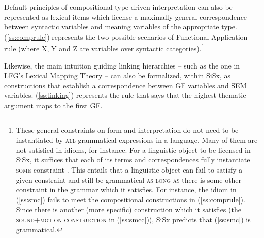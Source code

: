 \documentclass[output=paper,hidelinks]{langscibook}
\begin{document}
Default principles of compositional type-driven interpretation can also be represented as lexical items which license a maximally general correspondence between syntactic variables and meaning variables of the appropriate type. (\ref{ss:comprule}) represents the two possible scenarios of  Functional Application rule (where X, Y and Z are variables over syntactic categories).\footnote{These general constraints on form and interpretation do not need to be instantiated by \textsc{all} grammatical expressions in a language. Many of them are not satisfied in idioms, for instance. For a linguistic object to be licensed in SiSx, it suffices that each of its terms and correspondences fully instantiate \textsc{some} constraint \citep{culicover2019origin}. This entails that a linguistic object can fail to satisfy a given constraint and still be grammatical \textsc{as long as} there is some other constraint in the grammar which it satisfies. For instance, the idiom in (\ref{ss:smc}) fails to meet the compositional constructions in (\ref{ss:comprule}). Since there is another (more specific) construction which it satisfies (the \textsc{sound+motion construction} in (\ref{ss:smcc})), SiSx predicts that (\ref{ss:smc})  is grammatical.}


\begin{exe}
\label{ss:comprule}
\end{exe}


Likewise, the main intuition guiding linking hierarchies -- such as the one in LFG's Lexical Mapping Theory \citep{bresnan1989locative} -- can also be formalized, within SiSx, as constructions that establish a correspondence between GF variables and SEM variables. (\ref{ss:linking}) represents the rule that says that the highest thematic argument maps to the first GF.

\begin{exe}
\label{ss:linking}
\end{exe}
\end{document}
